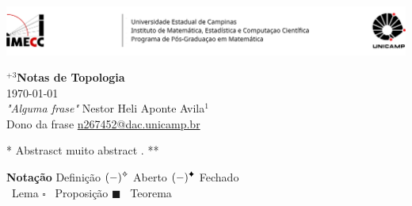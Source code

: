 \documentclass[a4paper, 17pt]{extarticle}
\begin{document}
\setlength{\columnsep}{1in}


\-\vspace{-1.3cm} 

\par\noindent \includegraphics[width = \linewidth]{Imagens/Header.png} 


\begin{center} %
{%
\LARGE \textbf{\(^{+3}\)Notas de Topologia}} \vspace{0.1in}   \\
 { \today }\\ 
 {\small
 \vspace{0.4cm}\emph{"Alguma frase" }\hfill Nestor Heli Aponte Avila\(^{1}\) \\ 
  
Dono da frase \hfill \href{mailto:n267452@dac.unicamp.br}{\url{n267452@dac.unicamp.br}}} %
\end{center} %
\- \vspace{-1cm}

{\small ** Abstrasct muito abstract . **\vspace{0.3cm}}%


{\large \textbf{Notação}} \hfill {}  Definição \hfill \((-)^{\text{\ding{71}}}\)  Aberto \hfill  \((-)^{\text{\ding{70}}}\) Fechado \\ 
\- \hspace{4.7cm}{\scriptsize$\square$} \ Lema \hspace{2.9cm} {\large$\square$} \ Proposição \hspace{1.3cm}  {\large $\blacksquare$}  \ Teorema
\end{document}
